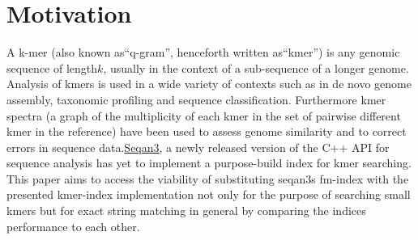 \chapter{Motivation}

A k-mer (also known as``q-gram'', henceforth written as``kmer'')
is any genomic sequence of length$k$, usually in the context of a
sub-sequence of a longer genome. Analysis of kmers is used in a wide
variety of contexts such as in de novo genome assembly\cite{SOAPdenovo},
taxonomic profiling\cite{phenotype:classification:with:kmer:spectrum} and sequence
classification\cite{kraken:sequence:classification}. Furthermore kmer spectra (a
graph of the multiplicity of each kmer in the set of pairwise different
kmer in the reference) have been used to assess genome similarity\cite{kmer:spectrum:dissimilarity}
and to correct errors in sequence data\cite{musket:kmer:spectrum:error:correction}.\href{https://github.com/seqan/seqan3}{Seqan3},
a newly released version of the C++ API for sequence analysis has
yet to implement a purpose-build index for kmer searching. This paper
aims to access the viability of substituting seqan3s fm-index\cite{fm:index:master:thesis}
with the presented kmer-index implementation not only for the purpose
of searching small kmers but for exact string matching in general
by comparing the indices performance to each other.